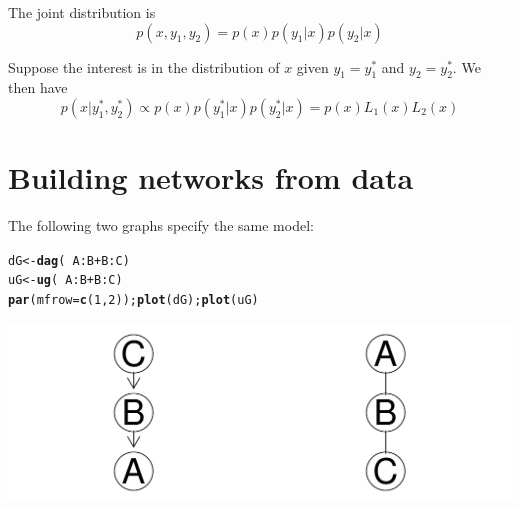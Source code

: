 \documentclass[10pt]{article}\usepackage[]{graphicx}\usepackage[]{xcolor}
\makeatletter
\def\maxwidth{ %
  \ifdim\Gin@nat@width>\linewidth
    \linewidth
  \else
    \Gin@nat@width
  \fi
}
\newcommand{\hlnum}[1]{\textcolor[rgb]{0.686,0.059,0.569}{#1}}%
\newcommand{\hlopt}[1]{\textcolor[rgb]{0,0,0}{#1}}%
\newcommand{\hlstd}[1]{\textcolor[rgb]{0.345,0.345,0.345}{#1}}%
\newcommand{\hlkwb}[1]{\textcolor[rgb]{0.69,0.353,0.396}{#1}}%
\newcommand{\hlkwc}[1]{\textcolor[rgb]{0.333,0.667,0.333}{#1}}%
\newcommand{\hlkwd}[1]{\textcolor[rgb]{0.737,0.353,0.396}{\textbf{#1}}}%
\newenvironment{kframe}{%
 \def\at@end@of@kframe{}%
 \ifinner\ifhmode%
  \def\at@end@of@kframe{\end{minipage}}%
  \begin{minipage}{\columnwidth}%
 \fi\fi%
 \def\FrameCommand##1{\hskip\@totalleftmargin \hskip-\fboxsep
 \colorbox{shadecolor}{##1}\hskip-\fboxsep
     \hskip-\linewidth \hskip-\@totalleftmargin \hskip\columnwidth}%
 \MakeFramed {\advance\hsize-\width
   \@totalleftmargin\z@ \linewidth\hsize
   \@setminipage}}%
 {\par\unskip\endMakeFramed%
 \at@end@of@kframe}
\newenvironment{knitrout}{}{} %
\makeatother
\begin{document}
The joint distribution is
\begin{displaymath}
  p(x,y_1, y_2) = p(x)p(y_1|x)p(y_2|x)
\end{displaymath}

Suppose the interest is in the distribution of $x$ given
$y_1=y_1^*$ and $y_2=y_2^*$. We then have
\begin{displaymath}
  p(x|y_1^*, y_2^*) \propto p(x) p(y_1^*|x)p(y_2^*|x) =
  p(x) L_1(x) L_2(x)
\end{displaymath}



\appendix

\section{Building networks from data}
\label{sec:using-textttsm-argum}

The following two graphs specify the same model:
\begin{knitrout}
\color{fgcolor}\begin{kframe}
\begin{alltt}
\hlstd{dG}  \hlkwb{<-} \hlkwd{dag}\hlstd{(}\hlopt{~}\hlstd{A}\hlopt{:}\hlstd{B} \hlopt{+} \hlstd{B}\hlopt{:}\hlstd{C)}
\hlstd{uG}  \hlkwb{<-} \hlkwd{ug}\hlstd{(}\hlopt{~}\hlstd{A}\hlopt{:}\hlstd{B} \hlopt{+} \hlstd{B}\hlopt{:}\hlstd{C)}
\hlkwd{par}\hlstd{(}\hlkwc{mfrow}\hlstd{=}\hlkwd{c}\hlstd{(}\hlnum{1}\hlstd{,}\hlnum{2}\hlstd{));} \hlkwd{plot}\hlstd{( dG );} \hlkwd{plot}\hlstd{( uG )}
\end{alltt}
\end{kframe}
\includegraphics[width=\maxwidth]{figures/grain-unnamed-chunk-41-1} 
\end{knitrout}
\end{document}
